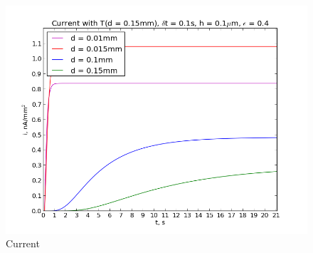 \documentclass[12pt, a4paper, lithuanian]{article}
\begin{document}
\begin{figure}[H]
    \centering
    \includegraphics[scale=0.5]{img/i}
    \caption{Current}
    \label{img:mlp}
\end{figure}





%
\end{document}
